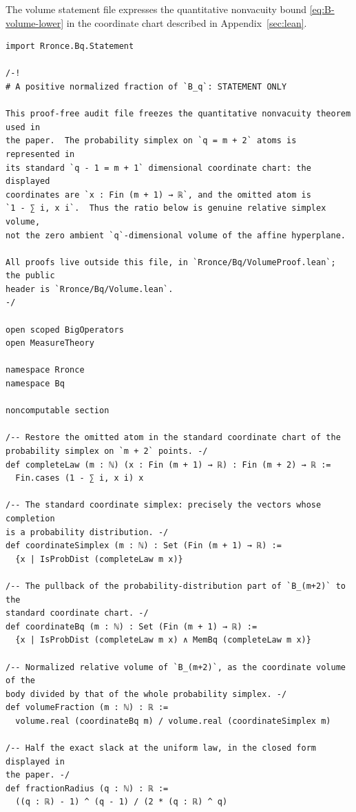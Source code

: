 \documentclass[11pt]{article}
\theoremstyle{definition}
\theoremstyle{remark}
\begin{document}
The volume statement file expresses the quantitative nonvacuity bound
\eqref{eq:B-volume-lower} in the coordinate chart described in
Appendix~\ref{sec:lean}.

\begin{lstlisting}
import Rronce.Bq.Statement

/-!
# A positive normalized fraction of `B_q`: STATEMENT ONLY

This proof-free audit file freezes the quantitative nonvacuity theorem used in
the paper.  The probability simplex on `q = m + 2` atoms is represented in
its standard `q - 1 = m + 1` dimensional coordinate chart: the displayed
coordinates are `x : Fin (m + 1) → ℝ`, and the omitted atom is
`1 - ∑ i, x i`.  Thus the ratio below is genuine relative simplex volume,
not the zero ambient `q`-dimensional volume of the affine hyperplane.

All proofs live outside this file, in `Rronce/Bq/VolumeProof.lean`; the public
header is `Rronce/Bq/Volume.lean`.
-/

open scoped BigOperators
open MeasureTheory

namespace Rronce
namespace Bq

noncomputable section

/-- Restore the omitted atom in the standard coordinate chart of the
probability simplex on `m + 2` points. -/
def completeLaw (m : ℕ) (x : Fin (m + 1) → ℝ) : Fin (m + 2) → ℝ :=
  Fin.cases (1 - ∑ i, x i) x

/-- The standard coordinate simplex: precisely the vectors whose completion
is a probability distribution. -/
def coordinateSimplex (m : ℕ) : Set (Fin (m + 1) → ℝ) :=
  {x | IsProbDist (completeLaw m x)}

/-- The pullback of the probability-distribution part of `B_(m+2)` to the
standard coordinate chart. -/
def coordinateBq (m : ℕ) : Set (Fin (m + 1) → ℝ) :=
  {x | IsProbDist (completeLaw m x) ∧ MemBq (completeLaw m x)}

/-- Normalized relative volume of `B_(m+2)`, as the coordinate volume of the
body divided by that of the whole probability simplex. -/
def volumeFraction (m : ℕ) : ℝ :=
  volume.real (coordinateBq m) / volume.real (coordinateSimplex m)

/-- Half the exact slack at the uniform law, in the closed form displayed in
the paper. -/
def fractionRadius (q : ℕ) : ℝ :=
  ((q : ℝ) - 1) ^ (q - 1) / (2 * (q : ℝ) ^ q)


\end{lstlisting}
\end{document}
